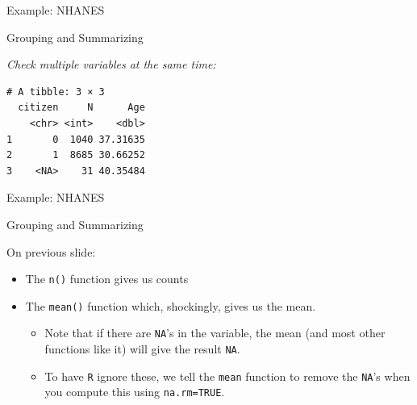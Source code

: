 \begin{frame}[fragile]{Example: NHANES}

\begin{block}{Grouping and Summarizing}

\emph{Check multiple variables at the same time:}

\begin{Shaded}
\end{Shaded}

\begin{verbatim}
# A tibble: 3 × 3
  citizen     N      Age
    <chr> <int>    <dbl>
1       0  1040 37.31635
2       1  8685 30.66252
3    <NA>    31 40.35484
\end{verbatim}

\end{block}

\end{frame}

\begin{frame}[fragile]{Example: NHANES}

\begin{block}{Grouping and Summarizing}

On previous slide:

\begin{itemize}
\tightlist
\item
  The \texttt{n()} function gives us counts
\item
  The \texttt{mean()} function which, shockingly, gives us the mean.

  \begin{itemize}
  \tightlist
  \item
    Note that if there are \texttt{NA}'s in the variable, the mean (and
    most other functions like it) will give the result \texttt{NA}.
  \item
    To have \texttt{R} ignore these, we tell the \texttt{mean} function
    to remove the \texttt{NA}'s when you compute this using
    \texttt{na.rm=TRUE}.
  \end{itemize}
\end{itemize}

\end{block}

\end{frame}


